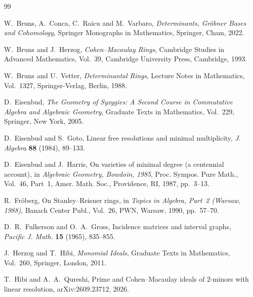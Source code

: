 \documentclass[12pt]{amsart}
\numberwithin{equation}{section}
\begin{document}
\begin{thebibliography}{99}

W.~Bruns, A.~Conca, C.~Raicu and M.~Varbaro,
\emph{Determinants, Gr\"obner Bases and Cohomology},
Springer Monographs in Mathematics,
Springer, Cham, 2022.

W.~Bruns and J.~Herzog,
\emph{Cohen--Macaulay Rings},
Cambridge Studies in Advanced Mathematics, Vol.~39,
Cambridge University Press, Cambridge, 1993.

W.~Bruns and U.~Vetter,
\emph{Determinantal Rings},
Lecture Notes in Mathematics, Vol.~1327,
Springer-Verlag, Berlin, 1988.


D.~Eisenbud,
\emph{The Geometry of Syzygies: A Second Course in Commutative Algebra and Algebraic Geometry},
Graduate Texts in Mathematics, Vol.~229,
Springer, New York, 2005.

D.~Eisenbud and S.~Goto,
Linear free resolutions and minimal multiplicity,
\emph{J. Algebra} \textbf{88} (1984), 89--133.

D.~Eisenbud and J.~Harris,
On varieties of minimal degree (a centennial account),
in \emph{Algebraic Geometry, Bowdoin, 1985},
Proc. Sympos. Pure Math., Vol.~46, Part~1,
Amer. Math. Soc., Providence, RI, 1987, pp.~3--13.

R.~Fr\"oberg,
On Stanley--Reisner rings,
in \emph{Topics in Algebra, Part~2 (Warsaw, 1988)},
Banach Center Publ., Vol.~26,
PWN, Warsaw, 1990, pp.~57--70.

D.~R.~Fulkerson and O.~A.~Gross,
Incidence matrices and interval graphs,
\emph{Pacific J. Math.} \textbf{15} (1965), 835--855.

J.~Herzog and T.~Hibi,
\emph{Monomial Ideals},
Graduate Texts in Mathematics, Vol.~260,
Springer, London, 2011.


T.~Hibi and A.~A.~Qureshi,
Prime and Cohen--Macaulay ideals of $2$-minors with linear resolution,
arXiv:2609.23712, 2026.


\end{thebibliography}
\end{document}
